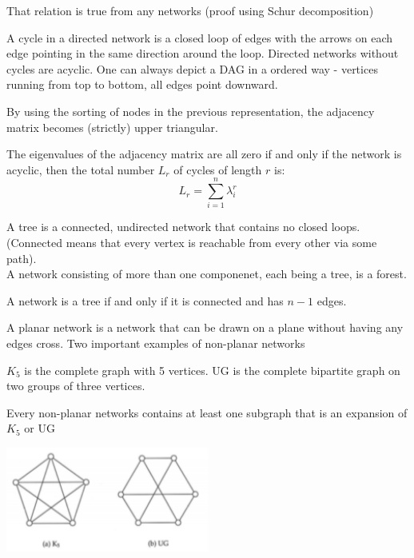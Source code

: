 That relation is true from any networks (proof using Schur decomposition)
\begin{mydefinition}
A cycle in a directed network is a closed loop of edges with the arrows on each edge pointing in the same direction around the loop. Directed networks without cycles are acyclic. One can always depict a DAG in a ordered way - vertices running from top to bottom, all edges point downward.
\end{mydefinition}
 By using the sorting of nodes in the previous representation, the adjacency matrix becomes (strictly) upper triangular.
 \begin{mytheorem} 
 The eigenvalues of the adjacency matrix are all zero if and only if the network is acyclic, then the total number $L_r$ of cycles of length $r$ is:
 	\[
 	L_r = \sum_{i =1}^n \lambda_i^r
 	\]
 \end{mytheorem}
\begin{mydefinition}
A tree is a connected, undirected network that contains no closed loops. (Connected means that every vertex is reachable from every other via some path).\\
A network consisting of more than one componenet, each being a tree, is a forest.
\end{mydefinition}
\begin{mytheorem}
	A network is a tree if and only if it is connected and has $n-1$ edges.
\end{mytheorem}
\begin{mydefinition}
A planar network is a network that can be drawn on a plane without having any edges cross. Two important examples of non-planar networks
\end{mydefinition}
$K_5$ is the complete graph with 5 vertices. UG is the complete bipartite graph on two groups of three vertices.
\begin{mytheorem}
	Every non-planar networks contains at least one subgraph that is an expansion of $K_5$ or UG
\end{mytheorem}
\begin{center}
	\includegraphics[width=0.5\textwidth]{picture/(40)k5_ug.png}
\end{center}
